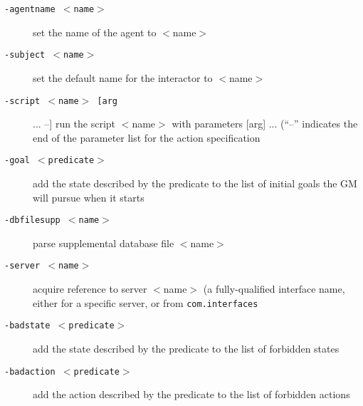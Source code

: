\documentclass[11pt,letterpaper]{article}
\begin{document}
\begin{description}
  \item[\tt -agentname $<$name$>$] set the name of the agent to $<$name$>$
  \item[\tt -subject $<$name$>$] set the default name for the interactor
    to $<$name$>$
  \item[\tt -script $<$name$>$ [arg] ... --] run the script $<$name$>$ with
    parameters [arg] ... (``--'' indicates the end of the parameter
    list for the action specification
  \item[\tt -goal $<$predicate$>$] add the state described by the
    predicate to the list of initial goals the GM will pursue when it
    starts
  \item[\tt -dbfilesupp $<$name$>$] parse supplemental database file
    $<$name$>$
  \item[\tt -server $<$name$>$] acquire reference to server $<$name$>$ (a
    fully-qualified interface name, either for a specific server, or
    from {\tt com.interfaces}
  \item[\tt -badstate $<$predicate$>$] add the state described by the
    predicate to the list of forbidden states
  \item[\tt -badaction $<$predicate$>$] add the action described by the
    predicate to the list of forbidden actions
\end{description}

\end{document}

